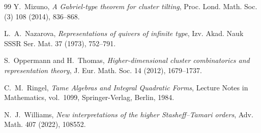 \documentclass[11pt,a4paper]{amsart}
\theoremstyle{definition}
\numberwithin{equation}{section}
\newcommand{\0}{\mathbf{0}}
\begin{document}
\begin{thebibliography}{99}
		Y.~Mizuno,
		\emph{A Gabriel-type theorem for cluster tilting},
		Proc. Lond. Math. Soc. (3) {108}  (2014), 836--868.
		
		L.~A.~Nazarova,
		\emph{Representations of quivers of infinite type},
		Izv. Akad. Nauk SSSR Ser. Mat. {37}  (1973), 752--791.
		
		S.~Oppermann and H.~Thomas,
		\emph{Higher-dimensional cluster combinatorics and representation theory},
		J. Eur. Math. Soc. {14}  (2012), 1679--1737.
		
		C.~M.~Ringel,
		\emph{Tame Algebras and Integral Quadratic Forms},
		Lecture Notes in Mathematics, vol.~1099,
		Springer-Verlag, Berlin, 1984.
		
		N.~J.~Williams,
		\emph{New interpretations of the higher Stasheff--Tamari orders},
		Adv. Math. {407} (2022), 108552.
		\end{thebibliography}
		
	
		
		
			\vskip 5pt
		\vskip 3pt
		
	
\end{document}
